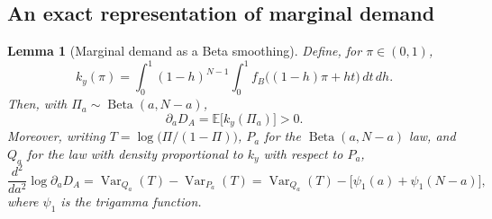 \documentclass[11pt]{article}
\newcommand{\E}{\mathbb E}
\DeclareMathOperator{\Beta}{Beta}
\DeclareMathOperator{\Var}{Var}
\newtheorem{lemma}{Lemma}
\theoremstyle{definition}
\begin{document}
\subsection{An exact representation of marginal demand}

\begin{lemma}[Marginal demand as a Beta smoothing]
\label{lem:marginal-demand-representation}
Define, for $\pi\in(0,1)$,
\begin{equation*}
k_y(\pi)=\int_0^1(1-h)^{N-1}\int_0^1
f_B\bigl((1-h)\pi+ht\bigr)\,dt\,dh.
\end{equation*}
Then, with $\Pi_a\sim\Beta(a,N-a)$,
\begin{equation}\label{eq:marginal-demand-representation}
\partial_aD_A=\E\bigl[k_y(\Pi_a)\bigr]>0.
\end{equation}
Moreover, writing $T=\log\bigl(\Pi/(1-\Pi)\bigr)$, $P_a$ for the
$\Beta(a,N-a)$ law, and $Q_a$ for the law with density proportional to
$k_y$ with respect to $P_a$,
\begin{equation}\label{eq:logconcavity-variance}
\frac{d^2}{da^2}\log\partial_aD_A
=\Var_{Q_a}(T)-\Var_{P_a}(T)
=\Var_{Q_a}(T)-\bigl[\psi_1(a)+\psi_1(N-a)\bigr],
\end{equation}
where $\psi_1$ is the trigamma function.
\end{lemma}
\end{document}
